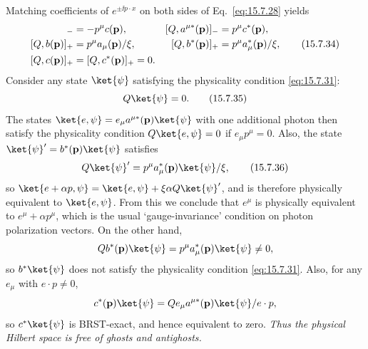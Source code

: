 Matching coefficients of $e^{\pm \ii p\cdot x}$ on both sides of Eq.~\eqref{eq:15.7.28} yields
\begin{align}
 [Q,a^\mu(\mathbf p)]_-&=-p^\mu c(\mathbf p),
 & [Q,a^{\mu*}(\mathbf p)]_-&=p^\mu c^*(\mathbf p),\notag\\
 [Q,b(\mathbf p)]_+&=p^\mu a_\mu(\mathbf p)/\xi,
 & [Q,b^*(\mathbf p)]_+&=p^\mu a_\mu^*(\mathbf p)/\xi,\tag{15.7.34}\label{eq:15.7.34}\\
 [Q,c(\mathbf p)]_+&=[Q,c^*(\mathbf p)]_+=0.\notag
\end{align}
Consider any state $\ket{\psi}$ satisfying the physicality condition \eqref{eq:15.7.31}:
\begin{equation}
 Q\ket{\psi}=0.
 \tag{15.7.35}\label{eq:15.7.35}
\end{equation}
The states $\ket{e,\psi}=e_\mu a^{\mu*}(\mathbf p)\ket{\psi}$ with one additional photon then satisfy the physicality condition $Q\ket{e,\psi}=0$ if $e_\mu p^\mu=0$. Also, the state $\ket{\psi}'=b^*(\mathbf p)\ket{\psi}$ satisfies
\begin{equation}
 Q\ket{\psi}'=p^\mu a_\mu^*(\mathbf p)\ket{\psi}/\xi,
 \tag{15.7.36}\label{eq:15.7.36}
\end{equation}
so $\ket{e+\alpha p,\psi}=\ket{e,\psi}+\xi\alpha Q\ket{\psi}'$, and is therefore physically equivalent to $\ket{e,\psi}$. From this we conclude that $e^\mu$ is physically equivalent to $e^\mu+\alpha p^\mu$, which is the usual `gauge-invariance' condition on photon polarization vectors. On the other hand,
\[
 Qb^*(\mathbf p)\ket{\psi}=p^\mu a_\mu^*(\mathbf p)\ket{\psi}\ne0,
\]
so $b^*\ket{\psi}$ does not satisfy the physicality condition \eqref{eq:15.7.31}. Also, for any $e_\mu$ with $e\cdot p\ne0$,
\[
 c^*(\mathbf p)\ket{\psi}=Qe_\mu a^{\mu*}(\mathbf p)\ket{\psi}/e\cdot p,
\]
so $c^*\ket{\psi}$ is BRST-exact, and hence equivalent to zero. \emph{Thus the physical Hilbert space is free of ghosts and antighosts.}

